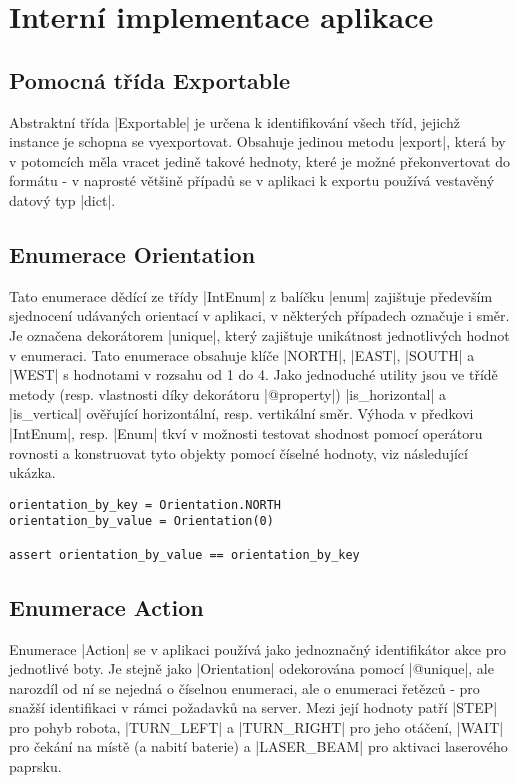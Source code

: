\section{Interní implementace aplikace}
\label{sec:implementation}

\subsection{Pomocná třída Exportable}

Abstraktní třída \ic|Exportable| je určena k identifikování všech tříd, jejichž instance je schopna se vyexportovat. Obsahuje jedinou metodu \ic|export|, která by v potomcích měla vracet jedině takové hednoty, které je možné překonvertovat do formátu  - v naprosté většině případů se v aplikaci k exportu používá vestavěný datový typ \ic|dict|.

\subsection{Enumerace Orientation}

Tato enumerace dědící ze třídy \ic|IntEnum| z balíčku \ic|enum| zajištuje především sjednocení udávaných orientací v aplikaci, v některých případech označuje i směr. Je označena dekorátorem \ic|unique|, který zajištuje unikátnost jednotlivých hodnot v enumeraci. Tato enumerace obsahuje klíče \ic|NORTH|, \ic|EAST|, \ic|SOUTH| a \ic|WEST| s hodnotami v rozsahu od 1 do 4. Jako jednoduché utility jsou ve třídě metody (resp. vlastnosti díky dekorátoru \ic|@property|) \ic|is_horizontal| a \ic|is_vertical| ověřující horizontální, resp. vertikální směr. Výhoda v předkovi \ic|IntEnum|, resp. \ic|Enum| tkví v možnosti testovat shodnost pomocí operátoru rovnosti a konstruovat tyto objekty pomocí číselné hodnoty, viz následující ukázka.

\begin{lstlisting}[caption={Výhody třídy Enum}]
orientation_by_key = Orientation.NORTH
orientation_by_value = Orientation(0)

assert orientation_by_value == orientation_by_key
\end{lstlisting}

\subsection{Enumerace Action}

Enumerace \ic|Action| se v aplikaci používá jako jednoznačný identifikátor akce pro jednotlivé boty. Je stejně jako \ic|Orientation| odekorována pomocí \ic|@unique|, ale narozdíl od ní se nejedná o číselnou enumeraci, ale o enumeraci řetězců - pro snažší identifikaci v rámci požadavků na server.
Mezi její hodnoty patří \ic|STEP| pro pohyb robota, \ic|TURN_LEFT| a \ic|TURN_RIGHT| pro jeho otáčení, \ic|WAIT| pro čekání na místě (a nabití baterie) a \ic|LASER_BEAM| pro aktivaci laserového paprsku.

